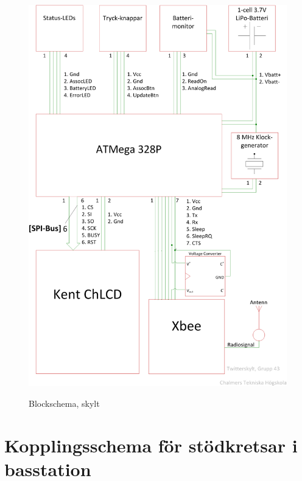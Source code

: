 \documentclass[a4paper,11pt]{article}
\begin{document}
\begin{figure}[H]
\includegraphics[scale=0.6, angle=0]{block_skylt.png}
\label{fig:block_skylt}
\caption{Blockschema, skylt}
\end{figure}
\pagebreak

\section{Kopplingsschema för stödkretsar i basstation}
\end{document}
